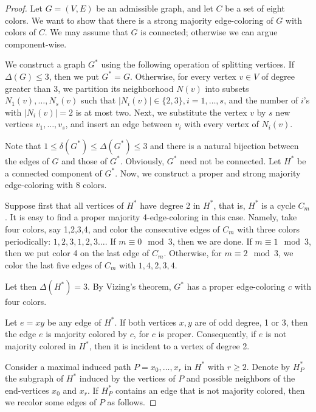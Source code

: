 \documentclass[10pt,a4paper]{amsart}
\begin{document}
\begin{proof} Let $G=(V,E)$ be an admissible graph, and let $C$ be a set of eight colors. We want to show that there is a strong majority edge-coloring of $G$ with  colors of $C$. We may assume that $G$ is connected; otherwise we can argue component-wise.

We construct a graph $G^*$ using the following operation of splitting vertices. If $\Delta(G)\le 3$, then we put  $G^*=G$.  Otherwise, for every vertex $v\in V$  of degree greater than 3, we partition its neighborhood $N(v)$ into subsets $N_1(v),\ldots,N_s(v)$ such that $|N_i(v)|\in \{2,3\}, i=1,\ldots,s$, and the number of $i$'s with $|N_i(v)|=2$ is at most two. Next, we substitute the vertex $v$ by $s$ new vertices $v_1,\ldots,v_s$, and insert an edge between $v_i$ with every vertex of $N_i(v)$.  

Note that $1\le \delta(G^*)\le\Delta(G^*)\leq 3$ and there is a natural bijection between the edges of $G$ and those of $G^*$.  Obviously, $G^*$ need not be connected. Let $H^*$ be a connected component of $G^*$. Now, we construct a proper and strong majority edge-coloring with 8 colors. 

Suppose first that all vertices of $H^*$ have degree 2 in $H^*$, that is, $H^*$ is a cycle $C_m$. It is easy to find a proper majority 4-edge-coloring in this case. Namely, take four colors, say 1,2,3,4, and color the consecutive edges of $C_m$ with three colors periodically: $1,2,3,1,2,3\ldots$. If $m\equiv 0\mod 3$, then we are done. If $m\equiv 1 \mod 3$, then we put color 4 on the last edge of $C_m$. Otherwise, for $m\equiv 2 \mod 3$, we color the last five  edges of $C_m$ with $1,4,2,3,4$.   
 
Let then $\Delta(H^*)=3$. By Vizing's theorem, $G^*$ has a proper edge-coloring $c$ with four colors. 

Let $e=xy$ be any edge of $H^*$. If both vertices $x,y$ are of odd degree, 1 or 3, then the edge $e$ is majority colored by $c$, for $c$ is proper. Consequently, if $e$ is not majority colored in $H^*$, then it is incident to a vertex of degree 2. 

Consider a maximal induced path $P=x_0,\ldots,x_r$ in $H^*$ with $r\ge 2$. Denote by $H^*_P$ the subgraph of $H^*$ induced by the vertices of $P$ and possible neighbors of the end-vertices $x_0$ and $x_r$. If $H^*_P$ contains an edge that is not majority colored, then we recolor some edges of $P$ as follows.


\end{proof}
\end{document}
